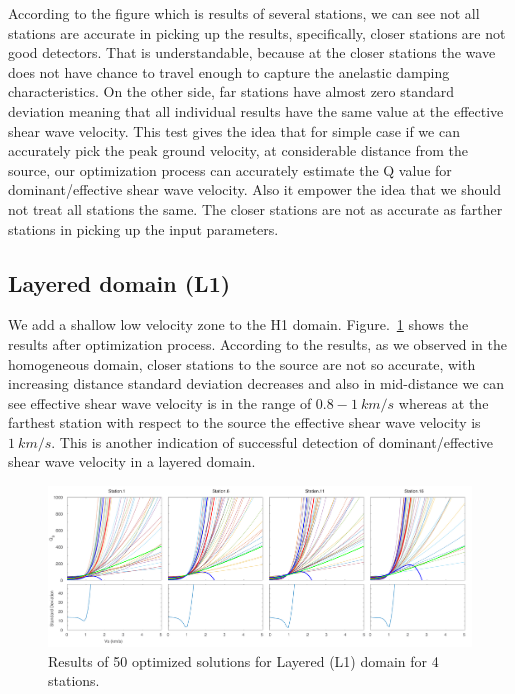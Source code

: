 According to the figure which is results of several stations, we can see not all stations are accurate in picking up the results, specifically, closer stations are not good detectors. That is understandable, because at the closer stations the wave does not have chance to travel enough to capture the anelastic damping characteristics. On the other side, far stations have almost zero standard deviation meaning that all individual results have the same value at the effective shear wave velocity. This test gives the idea that for simple case if we can accurately pick the peak ground velocity, at considerable distance from the source, our optimization process can accurately estimate the Q value for dominant/effective shear wave velocity. Also it empower the idea that we should not treat all stations the same. The closer stations are not as accurate as farther stations in picking up the input parameters. 

\subsection{Layered domain (L1)}

We add a shallow low velocity zone to the H1 domain. Figure.~\ref{fig:station_1_1000_500_L1} shows the results after optimization process. According to the results, as we observed in the homogeneous domain, closer stations to the source are not so accurate, with increasing distance standard deviation decreases and also in mid-distance we can see effective shear wave velocity is in the range of $0.8-1 ~ km/s$ whereas at the  farthest station with respect to the source the effective shear wave velocity is $1~km/s$. This is another indication of successful detection of dominant/effective shear wave velocity in a layered domain.  

  \begin{figure}[ht]
    \centering
    \includegraphics[width=\textwidth]{figures/pdf/station_1_1000_500_L1.pdf}
    \caption{Results of 50 optimized solutions for Layered (L1) domain for 4 stations.}
    \label{fig:station_1_1000_500_L1}
\end{figure}

